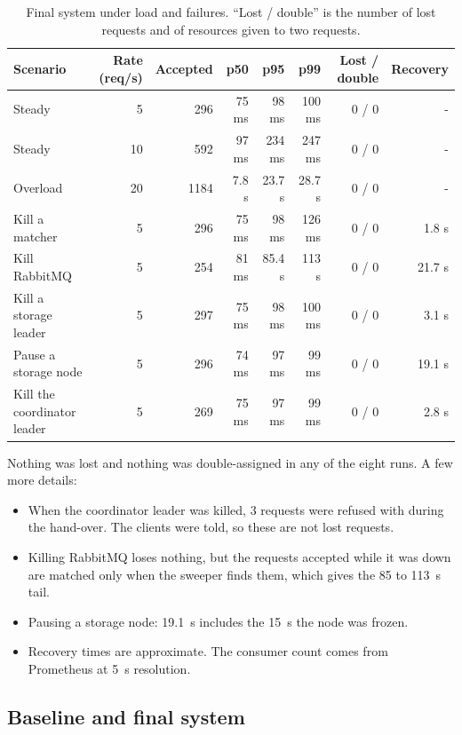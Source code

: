 \documentclass[a4paper,10pt]{article}
\newcommand{\code}[1]{\texttt{\detokenize{#1}}}
\begin{document}
\begin{table}[htbp]
    \centering
    \small
    \begin{tabular}{l r r r r r r r}
        \toprule
        Scenario & Rate (req/s) & Accepted & p50 & p95 & p99 & Lost / double & Recovery \\
        \midrule
        Steady & 5 & 296 & 75 ms & 98 ms & 100 ms & 0 / 0 & - \\
        Steady & 10 & 592 & 97 ms & 234 ms & 247 ms & 0 / 0 & - \\
        Overload & 20 & 1184 & 7.8 s & 23.7 s & 28.7 s & 0 / 0 & - \\
        Kill a matcher & 5 & 296 & 75 ms & 98 ms & 126 ms & 0 / 0 & 1.8 s \\
        Kill RabbitMQ & 5 & 254 & 81 ms & 85.4 s & 113 s & 0 / 0 & 21.7 s \\
        Kill a storage leader & 5 & 297 & 75 ms & 98 ms & 100 ms & 0 / 0 & 3.1 s \\
        Pause a storage node & 5 & 296 & 74 ms & 97 ms & 99 ms & 0 / 0 & 19.1 s \\
        Kill the coordinator leader & 5 & 269 & 75 ms & 97 ms & 99 ms & 0 / 0 & 2.8 s \\
        \bottomrule
    \end{tabular}
    \caption{Final system under load and failures. ``Lost / double'' is the number of lost
    requests and of resources given to two requests.}
    \label{tab:load}
\end{table}

Nothing was lost and nothing was double-assigned in any of the eight runs. A few more details:
\begin{itemize}
    \item When the coordinator leader was killed, 3 requests were refused with \code{503} during the
    hand-over. The clients were told, so these are not lost requests.
    \item Killing RabbitMQ loses nothing, but the requests accepted while it was down are matched
    only when the sweeper finds them, which gives the 85 to 113~s tail.
    \item Pausing a storage node: 19.1~s includes the 15~s the node was frozen.
    \item Recovery times are approximate. The consumer count comes from Prometheus at 5~s
    resolution.
\end{itemize}

\subsection{Baseline and final system}
\end{document}
